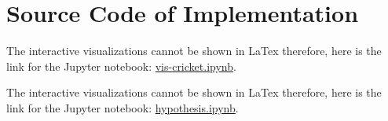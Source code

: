 \documentclass[fleqn,10pt]{wlscirep}
\begin{document}
\section{Source Code of Implementation}


The interactive visualizations cannot be shown in LaTex therefore, here is the link for the Jupyter notebook: \href{https://nbviewer.jupyter.org/github/dev-SB/cricket-bi/blob/master/vis-cricket.ipynb}{vis-cricket.ipynb}.

The interactive visualizations cannot be shown in LaTex therefore, here is the link for the Jupyter notebook: \href{https://nbviewer.jupyter.org/github/dev-SB/cricket-bi/blob/master/hypothesis.ipynb}{hypothesis.ipynb}.

\end{document}
